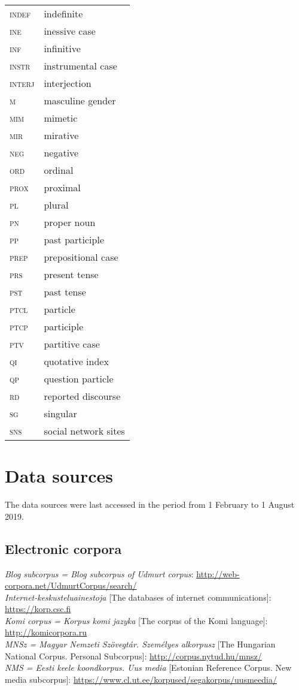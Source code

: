 \documentclass[output=paper,colorlinks,citecolor=brown]{langscibook}
\begin{document}
\begin{tabularx}{.45\textwidth}{lQ}
\textsc{indef} & indefinite\\
\textsc{ine} & inessive case\\
\textsc{inf} & infinitive\\
\textsc{instr} & instrumental case\\
\textsc{interj} & interjection\\
\textsc{m} & masculine gender\\
\textsc{mim} & mimetic\\
\textsc{mir} & mirative\\
\textsc{neg} & negative\\
\textsc{ord} & ordinal\\
\textsc{prox} & proximal\\
\textsc{pl} & plural\\
\textsc{pn} & proper noun\\
\textsc{pp} & past participle\\
\textsc{prep} & prepositional case\\
\textsc{prs} & present tense\\
\textsc{pst} & past tense\\
\textsc{ptcl} & particle\\
\textsc{ptcp} & participle\\
\textsc{ptv} & partitive case\\
\textsc{qi} & quotative index\\
\textsc{qp} & question particle\\
\textsc{rd} & reported discourse\\
\textsc{sg} & singular\\
\textsc{sns} & social network sites\\
\end{tabularx}

\section*{Data sources}

The data sources were last accessed in the period from 1 February to 1 August 2019.

\subsection*{Electronic corpora}
\textit{Blog subcorpus = Blog subcorpus of Udmurt corpus}: \url{http://web-corpora.net/UdmurtCorpus/search/}\\
\textit{Internet-keskusteluainestoja} [The databases of internet communications]:  \url{https://korp.csc.fi}\\
\textit{Komi corpus = Korpus komi jazyka} [The corpus of the Komi language]: \url{http://komicorpora.ru}\\
\textit{MNSz = Magyar Nemzeti Szövegtár. Személyes alkorpusz} [The Hungarian National Corpus. Personal Subcorpus]: \url{http://corpus.nytud.hu/mnsz/}\\
\textit{NMS = Eesti keele koondkorpus. Uus media} [Estonian Reference Corpus. New media subcorpus]: \url{https://www.cl.ut.ee/korpused/segakorpus/uusmeedia/}\\
\end{document}
